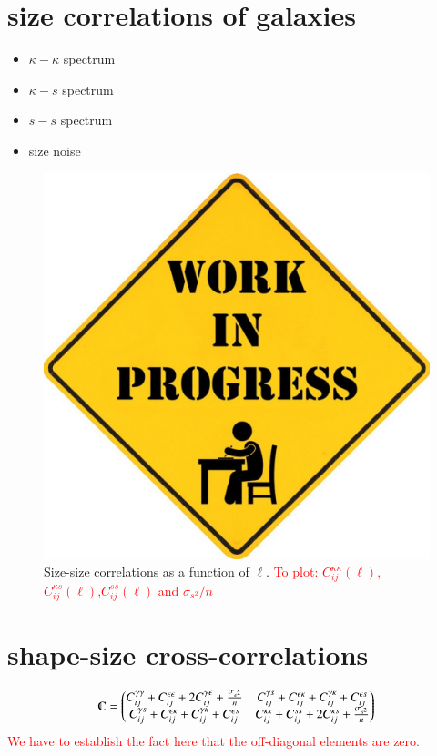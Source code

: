 \documentclass[a4paper,fleqn,usenatbib]{mnras}
\newcommand\BG[1]{\textcolor{red}{#1}}
\begin{document}
\section{size correlations of galaxies}\label{sect_sizes}
\begin{itemize}
    \item $\kappa-\kappa$ spectrum 
    \item $\kappa-s$ spectrum
    \item $s-s$ spectrum
    \item size noise
\end{itemize}
\begin{figure}
    \centering
    \includegraphics[scale=0.1]{wip.jpg}
    \caption{Size-size correlations as a function of $\ell$. \BG{To plot: $C_{ij}^{\kappa\kappa}(\ell)$,$C_{ij}^{\kappa s}(\ell)$,$C_{ij}^{ss}(\ell)$ and $\sigma_{s^2}/n$}}
    \label{fig:shapeshape}
\end{figure}
\section{shape-size cross-correlations}\label{sect_cross}
$$\varmathbb{C}=\begin{pmatrix}
C_{ij}^{\gamma\gamma}+C_{ij}^{\epsilon\epsilon}+2C_{ij}^{\gamma\epsilon}+\frac{\sigma_{\epsilon^2}}{n} & C_{ij}^{\gamma s}+C_{ij}^{\epsilon\kappa}+C_{ij}^{\gamma\kappa}+C_{ij}^{\epsilon s}   \\
C_{ij}^{\gamma s}+C_{ij}^{\epsilon\kappa}+C_{ij}^{\gamma\kappa}+C_{ij}^{\epsilon s} & C_{ij}^{\kappa\kappa}+C_{ij}^{ss}+2C_{ij}^{\kappa s}+\frac{\sigma_{s^2}}{n}
\end{pmatrix}$$
\BG{We have to establish the fact here that the off-diagonal elements are zero.}
\end{document}
